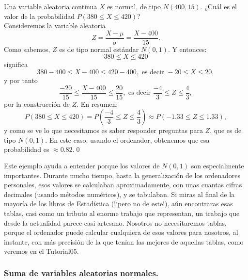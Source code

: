    \begin{ejemplo}
   \label{cap05:ejem:CalculoProbabilidadPorTipificacion}
   Una variable aleatoria continua $X$ es normal, de tipo $N(400,15)$. ¿Cuál es el valor de la probabilidad $P(380\leq X\leq 420)$?\\
   Consideremos la variable aleatoria
   \[Z=\dfrac{X-\mu}{\sigma}=\dfrac{X-400}{15}.\]
   Como sabemos, $Z$ es de tipo normal estándar $N(0,1)$. Y entonces:
   \[380\leq X\leq 420\]
   significa
   \[380-400\leq X-400\leq 420-400,\mbox{ es decir }-20\leq X\leq 20,\]
   y por tanto
   \[\dfrac{-20}{15}\leq \dfrac{X-400}{15}\leq\dfrac{20}{15},\mbox{ es decir }\dfrac{-4}{3}\leq Z\leq\dfrac{4}{3},\]
   por la construcción de $Z$. En resumen:
   \[P(380\leq X\leq 420)=P\left(\dfrac{-4}{3}\leq Z\leq\dfrac{4}{3}\right)\approx P(-1.33\leq Z\leq 1.33),\]
   y como se ve lo que necesitamos es saber responder preguntas para $Z$, que es de tipo $N(0,1)$. En este caso, usando el ordenador,  obtenemos que esa probabilidad es $\approx 0.82$.\qed
   \end{ejemplo}
Este ejemplo ayuda a entender porque los valores de $N(0,1)$ son especialmente importantes. Durante mucho tiempo, hasta la generalización de los ordenadores personales, esos valores se calculaban aproximadamente, con unas cuantas cifras decimales (usando métodos numéricos), y se tabulaban. Si miras al final de la mayoría de los libros de Estadística ({!`}pero no de este!), aún encontraras esas tablas, casi como un tributo al enorme trabajo que representan, un trabajo que desde la actualidad parece casi artesano. Nosotros no necesitaremos tablas, porque el ordenador puede calcular cualquiera de esos valores para nosotros, al instante, con más precisión de la que tenían las mejores de aquellas tablas, como veremos en el Tutorial05.

\subsubsection{Suma de variables aleatorias normales.}
\label{cap05:subsubsec:SumaVariablesAleatoriasNormales}

